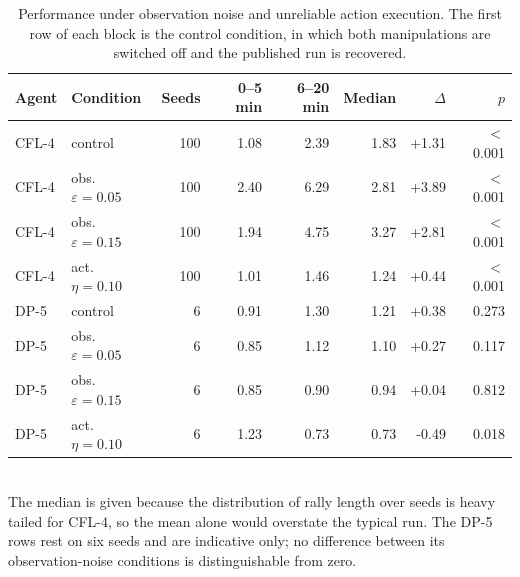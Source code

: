 \begin{table}[ht]
\centering
\small
\caption{Performance under observation noise and unreliable action execution. The first row of each block is the control condition, in which both manipulations are switched off and the published run is recovered.}
\label{tab:noise}
\begin{tabular}{llrrrrrr}
\toprule
Agent & Condition & Seeds & 0--5 min & 6--20 min & Median & $\Delta$ & $p$ \\
\midrule
CFL-4 & control & 100 & 1.08 & 2.39 & 1.83 & +1.31 & $<$0.001 \\
CFL-4 & obs. $\varepsilon = 0.05$ & 100 & 2.40 & 6.29 & 2.81 & +3.89 & $<$0.001 \\
CFL-4 & obs. $\varepsilon = 0.15$ & 100 & 1.94 & 4.75 & 3.27 & +2.81 & $<$0.001 \\
CFL-4 & act. $\eta = 0.10$ & 100 & 1.01 & 1.46 & 1.24 & +0.44 & $<$0.001 \\
DP-5 & control & 6 & 0.91 & 1.30 & 1.21 & +0.38 & 0.273 \\
DP-5 & obs. $\varepsilon = 0.05$ & 6 & 0.85 & 1.12 & 1.10 & +0.27 & 0.117 \\
DP-5 & obs. $\varepsilon = 0.15$ & 6 & 0.85 & 0.90 & 0.94 & +0.04 & 0.812 \\
DP-5 & act. $\eta = 0.10$ & 6 & 1.23 & 0.73 & 0.73 & -0.49 & 0.018 \\
\bottomrule
\end{tabular}
\\[4pt]\footnotesize{The median is given because the distribution of rally length over seeds is heavy tailed for CFL-4, so the mean alone would overstate the typical run. The DP-5 rows rest on six seeds and are indicative only; no difference between its observation-noise conditions is distinguishable from zero.}
\end{table}
